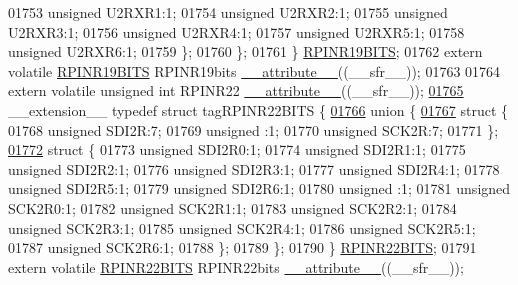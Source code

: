 \begin{DoxyCode}
01753       \textcolor{keywordtype}{unsigned} U2RXR1:1;
01754       \textcolor{keywordtype}{unsigned} U2RXR2:1;
01755       \textcolor{keywordtype}{unsigned} U2RXR3:1;
01756       \textcolor{keywordtype}{unsigned} U2RXR4:1;
01757       \textcolor{keywordtype}{unsigned} U2RXR5:1;
01758       \textcolor{keywordtype}{unsigned} U2RXR6:1;
01759     \};
01760   \};
01761 \} \hyperlink{a00014_d3/dda/a00712}{RPINR19BITS};
01762 \textcolor{keyword}{extern} \textcolor{keyword}{volatile} \hyperlink{a00014_d3/dda/a00712}{RPINR19BITS} RPINR19bits \hyperlink{a00015_a493c46f03454991ccc5aa7a6e1dfb2a7}{\_\_attribute\_\_}((\_\_sfr\_\_));
01763 
01764 \textcolor{keyword}{extern} \textcolor{keyword}{volatile} \textcolor{keywordtype}{unsigned} \textcolor{keywordtype}{int}  RPINR22 \hyperlink{a00015_a493c46f03454991ccc5aa7a6e1dfb2a7}{\_\_attribute\_\_}((\_\_sfr\_\_));
\hypertarget{a00015_source_l01765}{}\hyperlink{a00014}{01765} \_\_extension\_\_ \textcolor{keyword}{typedef} \textcolor{keyword}{struct }tagRPINR22BITS \{
\hypertarget{a00015_source_l01766}{}\hyperlink{a00015}{01766}   \textcolor{keyword}{union }\{
\hypertarget{a00015_source_l01767}{}\hyperlink{a00015}{01767}     \textcolor{keyword}{struct }\{
01768       \textcolor{keywordtype}{unsigned} SDI2R:7;
01769       \textcolor{keywordtype}{unsigned} :1;
01770       \textcolor{keywordtype}{unsigned} SCK2R:7;
01771     \};
\hypertarget{a00015_source_l01772}{}\hyperlink{a00015}{01772}     \textcolor{keyword}{struct }\{
01773       \textcolor{keywordtype}{unsigned} SDI2R0:1;
01774       \textcolor{keywordtype}{unsigned} SDI2R1:1;
01775       \textcolor{keywordtype}{unsigned} SDI2R2:1;
01776       \textcolor{keywordtype}{unsigned} SDI2R3:1;
01777       \textcolor{keywordtype}{unsigned} SDI2R4:1;
01778       \textcolor{keywordtype}{unsigned} SDI2R5:1;
01779       \textcolor{keywordtype}{unsigned} SDI2R6:1;
01780       \textcolor{keywordtype}{unsigned} :1;
01781       \textcolor{keywordtype}{unsigned} SCK2R0:1;
01782       \textcolor{keywordtype}{unsigned} SCK2R1:1;
01783       \textcolor{keywordtype}{unsigned} SCK2R2:1;
01784       \textcolor{keywordtype}{unsigned} SCK2R3:1;
01785       \textcolor{keywordtype}{unsigned} SCK2R4:1;
01786       \textcolor{keywordtype}{unsigned} SCK2R5:1;
01787       \textcolor{keywordtype}{unsigned} SCK2R6:1;
01788     \};
01789   \};
01790 \} \hyperlink{a00014_dc/d8f/a00718}{RPINR22BITS};
01791 \textcolor{keyword}{extern} \textcolor{keyword}{volatile} \hyperlink{a00014_dc/d8f/a00718}{RPINR22BITS} RPINR22bits \hyperlink{a00015_a493c46f03454991ccc5aa7a6e1dfb2a7}{\_\_attribute\_\_}((\_\_sfr\_\_));

\end{DoxyCode}
